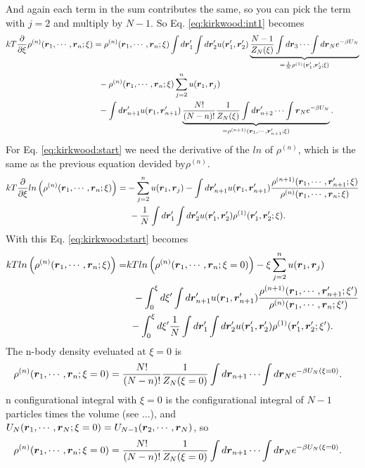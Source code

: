 And again each term in the sum contributes the same,
so you can pick the term with $j=2$ and multiply by $N-1$.
So Eq. \eqref{eq:kirkwood:int1} becomes
\begin{align}
kT\frac{\partial}{\partial \xi}
    \rho^{(n)}(\boldsymbol{r}_1,\cdots,\boldsymbol{r}_n;\xi)
&= \rho^{(n)}(\boldsymbol{r}_1,\cdots,\boldsymbol{r}_n;\xi)
        \int d\boldsymbol{r}_1' \int d\boldsymbol{r}_2' u(\boldsymbol{r}_1',\boldsymbol{r}_2')
        \underbrace{
        \frac{N-1}{Z_N(\xi)} 
        \int d\boldsymbol{r}_3 \cdots \int d\boldsymbol{r}_N e^{-\beta U_N} 
        }_{=\frac{1}{N}\rho^{(1)}(\boldsymbol{r}_1',\boldsymbol{r}_2';\xi)}
         \nonumber \\
    &~~- \rho^{(n)}(\boldsymbol{r}_1,\cdots,\boldsymbol{r}_n;\xi)
        \sum_{j=2}^{n} u(\boldsymbol{r}_1,\boldsymbol{r}_j)
        \nonumber \\
    &~~- \int d\boldsymbol{r}_{n+1}' u(\boldsymbol{r}_1,\boldsymbol{r}_{n+1}')
        \underbrace{
        \frac{N!}{(N-n)!} \frac{1}{Z_N(\xi)}
        \int d\boldsymbol{r}_{n+2}'\cdots \int \boldsymbol{r}_N e^{-\beta U_N}
        }_{=\rho^{(n+1)}(\boldsymbol{r}_1,\cdots,\boldsymbol{r}_{n+1}';\xi)}.
\nonumber
\end{align}
For Eq. \eqref{eq:kirkwood:start} we need the derivative of the $ln$ of $\rho^{(n)}$, which is the same as  the previous equation devided by$\rho^{(n)}$.
\begin{align}
kT\frac{\partial}{\partial \xi}
    ln\left(\rho^{(n)}(\boldsymbol{r}_1,\cdots,\boldsymbol{r}_n;\xi) \right)
=&- \sum_{j=2}^{n} u(\boldsymbol{r}_1,\boldsymbol{r}_j)
    - \int d\boldsymbol{r}_{n+1}' u(\boldsymbol{r}_1,\boldsymbol{r}_{n+1}')
        \frac{ \rho^{(n+1)}(\boldsymbol{r}_1,\cdots,\boldsymbol{r}_{n+1}';\xi)}
            { \rho^{(n)}(\boldsymbol{r}_1,\cdots,\boldsymbol{r}_{n};\xi)}
    \nonumber \\
&~- \frac{1}{N} \int d\boldsymbol{r}_1' \int d\boldsymbol{r}_2' u(\boldsymbol{r}_1',\boldsymbol{r}_2')
        \rho^{(1)}(\boldsymbol{r}_1',\boldsymbol{r}_2';\xi).
\nonumber
\end{align}
With this Eq. \eqref{eq:kirkwood:start} becomes
\begin{align}
kT ln\left(\rho^{(n)}(\boldsymbol{r}_1,\cdots,\boldsymbol{r}_n;\xi) \right)
=& kT ln\left(\rho^{(n)}(\boldsymbol{r}_1,\cdots,\boldsymbol{r}_n;\xi=0)\right)
        -\xi \sum_{j=2}^{n} u(\boldsymbol{r}_1,\boldsymbol{r}_j)
        \nonumber \\
 &~~ -\int_0^\xi d\xi' \int d\boldsymbol{r}_{n+1}' u(\boldsymbol{r}_1,\boldsymbol{r}_{n+1}')
        \frac{ \rho^{(n+1)}(\boldsymbol{r}_1,\cdots,\boldsymbol{r}_{n+1}';\xi')}
            { \rho^{(n)}(\boldsymbol{r}_1,\cdots,\boldsymbol{r}_{n};\xi')}
    \nonumber \\
&~-\int_0^\xi d\xi' \frac{1}{N} \int d\boldsymbol{r}_1' \int d\boldsymbol{r}_2' u(\boldsymbol{r}_1',\boldsymbol{r}_2')
        \rho^{(1)}(\boldsymbol{r}_1',\boldsymbol{r}_2';\xi').
\nonumber
\end{align}
The n-body density eveluated at $\xi=0$ is
\begin{align}
\rho^{(n)}(\boldsymbol{r}_1,\cdots,\boldsymbol{r}_n;\xi=0) 
&= \frac{N!}{(N-n)!} \frac{1}{Z_N(\xi=0)}
    \int d\boldsymbol{r}_{n+1} \cdots \int d\boldsymbol{r}_N 
    e^{-\beta U_N(\xi=0)}.
\nonumber
\end{align}
n configurational integral with $\xi=0$
is the configurational integral of $N-1$ particles times the 
volume (see ...), and
$U_N(\boldsymbol{r}_1,\cdots,\boldsymbol{r}_N;\xi=0) = U_{N-1}(\boldsymbol{r}_2,\cdots,\boldsymbol{r}_N)$,
so
\begin{align}
\rho^{(n)}(\boldsymbol{r}_1,\cdots,\boldsymbol{r}_n;\xi=0) 
&= \frac{N!}{(N-n)!} \frac{1}{Z_N(\xi=0)}
    \int d\boldsymbol{r}_{n+1} \cdots \int d\boldsymbol{r}_N 
    e^{-\beta U_N(\xi=0)}.
\nonumber
\end{align}


